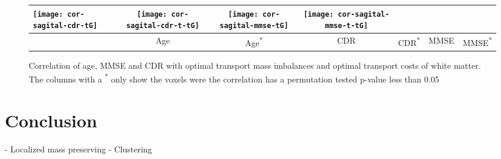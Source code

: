 \documentclass{llncs}
\begin{document}
\begin{figure}[!b]
\begin{tabular}{l|cc|cc|cc}
\texttt{[image: cor-sagital-cdr-tG]} &
\texttt{[image: cor-sagital-cdr-t-tG]} &
\texttt{[image: cor-sagital-mmse-tG]} &
\texttt{[image: cor-sagital-mmse-t-tG]} \\ \hline \hline
& \parbox[b][4mm]{6mm}{Age} 
& \parbox[b][4mm]{6mm}{Age\textsuperscript{*}} 
& \parbox[b][4mm]{6mm}{CDR} 
& \parbox[b][4mm]{6mm}{CDR\textsuperscript{*}}
& \parbox[b][4mm]{6mm}{MMSE}
& \parbox[b][4mm]{6mm}{MMSE\textsuperscript{*}}
\end{tabular}
\caption{\label{fig:cor-oasis-white}
Correlation of age, MMSE and CDR with optimal transport mass imbalances and
optimal transport costs of white matter. The columns with a \textsuperscript{*}
only show the voxels were the correlation has a permutation tested p-value less
than 0.05  }
\end{figure}
\endgroup




\section{Conclusion}

- Localized mass preserving
- Clustering
\end{document}
